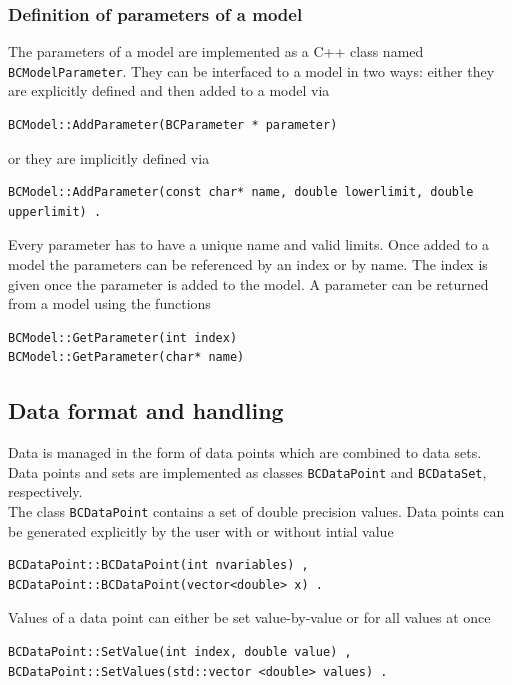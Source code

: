 \documentclass[11pt, a4paper]{article}
\begin{document}
\subsubsection{Definition of parameters of a model} 

The parameters of a model are implemented as a C++ class named
\verb|BCModelParameter|. They can be interfaced to a model in two
ways: either they are explicitly defined and then added to a model via 
%
\begin{verbatim}
BCModel::AddParameter(BCParameter * parameter) 
\end{verbatim}

\noindent 
or they are implicitly defined via 
%
\begin{verbatim}
BCModel::AddParameter(const char* name, double lowerlimit, double upperlimit) . 
\end{verbatim}

\noindent 
Every parameter has to have a unique name and valid limits. Once added
to a model the parameters can be referenced by an index or by
name. The index is given once the parameter is added to the model. A parameter can 
be returned from a model using the functions
% 
\begin{verbatim} 
BCModel::GetParameter(int index) 
BCModel::GetParameter(char* name) 
\end{verbatim}  


\subsection{Data format and handling} 
\label{subsection:data} 

Data is managed in the form of data points which are combined to data
sets. Data points and sets are implemented as classes
\verb|BCDataPoint| and \verb|BCDataSet|, respectively. \\ 

\noindent 
The class \verb|BCDataPoint| contains a set of double precision
values. Data points can be generated explicitly by the user with or
without intial value 
%
\begin{verbatim} 
BCDataPoint::BCDataPoint(int nvariables) ,
BCDataPoint::BCDataPoint(vector<double> x) .  
\end{verbatim} 

\noindent 
Values of a data point can either be set value-by-value or for all
values at once
%
\begin{verbatim} 
BCDataPoint::SetValue(int index, double value) , 
BCDataPoint::SetValues(std::vector <double> values) . 
\end{verbatim} 
\end{document}
